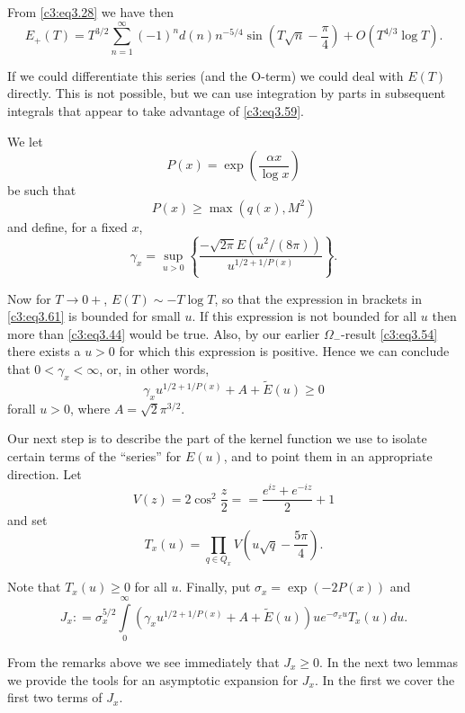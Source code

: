 From \eqref{c3:eq3.28} we have then 
{\fontsize{10pt}{12pt}\selectfont
\begin{equation}
  E_+ (T) = T^{3/2} \sum_{n=1}^\infty (-1)^n d(n) n^{-5/4} \sin
  \left(T\sqrt{n} - \frac{\pi}{4}\right) + O(T^{4/3} \log
  T).\label{c3:eq3.59} 
\end{equation}}

If we could differentiate this series (and the O-term) we could deal
with $E(T)$ directly. This is not possible, but we can use integration
by parts in subsequent integrals that appear to take advantage of
\eqref{c3:eq3.59}.

We let
$$
P(x) = \exp \left(\frac{\alpha x}{\log x} \right)
$$ 
be such that 
\begin{equation}
  P(x) \geq \max (q (x), M^2) \label{c3:eq3.60}
\end{equation}
and define, for a fixed $x$,
\begin{equation}
  \gamma_x = \sup_{u > 0} \left\{\frac{- \sqrt{2 \pi} E (u^2 /(8
    \pi))}{u^{1/2 +1/P(x)}}\right\}.\label{c3:eq3.61}
\end{equation}

Now for $T\to 0+$, $E(T) \sim - T \log T$, so that the expression in
brackets in \eqref{c3:eq3.61} is bounded for small $u$. If this
expression is not bounded for all $u$ then more than \eqref{c3:eq3.44}
would be true. Also, by our earlier $\Omega_-$-result
\eqref{c3:eq3.54} there exists a $u > 0$ for which this expression is
positive. Hence we can conclude that $0 < \gamma_x < \infty$, or, in
other words,
$$
\gamma_x u^{1/2+1/P(x)} + A + \tilde{E} (u) \geq 0
$$
for\pageoriginale all $u>0$, where $A = \sqrt{2} \pi^{3/2}$.

Our next step is to describe the part of the kernel function we use to
isolate certain terms of the ``series'' for $E(u)$, and to point them
in an appropriate direction. Let
$$
V(z) = 2 \cos ^2 \frac{z}{2} = =\frac{e^{iz}+ e^{-iz}}{2} +1
$$
and set
$$
T_x (u) = \prod_{q \in Q_x} V \left(u\sqrt{q} - \frac{5 \pi}{4} \right).
$$

Note that $T_x (u) \geq 0$ for all $u$. Finally, put $\sigma_x =
\exp(- 2P(x))$ and 
\begin{equation}
  J_x : = \sigma_x^{5/2} \int\limits_0^\infty \left(\gamma_x
  u^{1/2+1/P(x)} + A+ \tilde{E} (u) \right) u e^{- \sigma_x u} T_x (u)
  du.\label{c3:eq3.62} 
\end{equation}

From the remarks above we see immediately that $J_x \geq 0$. In the
next two lemmas we provide the tools for an asymptotic expansion for
$J_x$. In the first we cover the first two terms of $J_x$.

